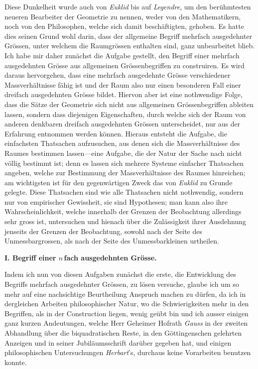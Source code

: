 \documentclass[a4paper,12pt]{article}
\begin{document}
Diese Dunkelheit wurde auch von \emph{Euklid} bis auf
\emph{Legendre}, um den ber\"{u}hmtesten neueren Bearbeiter der
Geometrie zu nennen, weder von den Mathematikern, noch von den
Philosophen, welche sich damit besch\"{a}ftigten, gehoben.  Es
hatte dies seinen Grund wohl darin, dass der allgemeine Begriff
mehrfach ausgedehnter Gr\"{o}ssen, unter welchem die
Raumgr\"{o}ssen enthalten sind, ganz unbearbeitet blieb.  Ich
habe mir daher zun\"{a}chst die Aufgabe gestellt, den Begriff
einer mehrfach ausgedehnten Gr\"{o}sse aus allgemeinen
Gr\"{o}ssenbegriffen zu construiren.  Es wird daraus hervorgehen,
dass eine mehrfach ausgedehnte Gr\"{o}sse verschiedener
Massverh\"{a}ltnisse f\"{a}hig ist und der Raum also nur einen
besonderen Fall einer dreifach ausgedehnten Gr\"{o}sse bildet.
Hiervon aber ist eine nothwendige Folge, dass die S\"{a}tze der
Geometrie sich nicht aus allgemeinen Gr\"{o}ssenbegriffen
ableiten lassen, sondern dass diejenigen Eigenschaften, durch
welche sich der Raum von anderen denkbaren dreifach ausgedehnten
Gr\"{o}ssen unterscheidet, nur aus der Erfahrung entnommen werden
k\"{o}nnen.  Hieraus entsteht die Aufgabe, die einfachsten
Thatsachen aufzusuchen, aus denen sich die Massverh\"{a}ltnisse
des Raumes bestimmen lassen---eine Aufgabe, die der Natur der
Sache nach nicht v\"{o}llig bestimmt ist; denn es lassen sich
mehrere Systeme einfacher Thatsachen angeben, welche zur
Bestimmung der Massverh\"{a}ltnisse des Raumes hinreichen; am
wichtigsten ist f\"{u}r den gegenw\"{a}rtigen Zweck das von
\emph{Euklid} zu Grunde gelegte.  Diese Thatsachen sind wie
alle Thatsachen nicht nothwendig, sondern nur von empirischer
Gewissheit, sie sind Hypothesen; man kann also ihre
Wahrscheinlichkeit, welche innerhalb der Grenzen der Beobachtung
allerdings sehr gross ist, untersuchen und hienach \"{u}ber die
Zul\"{a}ssigkeit ihrer Ausdehnung jenseits der Grenzen der
Beobachtung, sowohl nach der Seite des Unmessbargrossen, als nach
der Seite des Unmessbarkleinen urtheilen.

\begin{center}
\large\bfseries
I. Begriff einer $n \,$\-fach ausgedehnten Gr\"{o}sse.
\end{center}

Indem ich nun von diesen Aufgaben zun\"{a}chst die erste, die
Entwicklung des Begriffs mehrfach ausgedehnter Gr\"{o}ssen, zu
l\"{o}sen versuche, glaube ich um so mehr auf eine nachsichtige
Beurtheilung Anspruch machen zu d\"{u}rfen, da ich in dergleichen
Arbeiten philosophischer Natur, wo die Schwierigkeiten mehr in
den Begriffen, als in der Construction liegen, wenig ge\"{u}bt
bin und ich ausser einigen ganz kurzen Andeutungen, welche Herr
Geheimer Hofrath \emph{Gauss} in der zweiten Abhandlung
\"{u}ber die biquadratischen Reste, in den G\"{o}ttingenschen
gelehrten Anzeigen und in seiner Jubil\"{a}umsschrift dar\"{u}ber
gegeben hat, und einigen philosophischen Untersuchungen
\emph{Herbart}'s, durchaus keine Vorarbeiten benutzen konnte.
\end{document}
